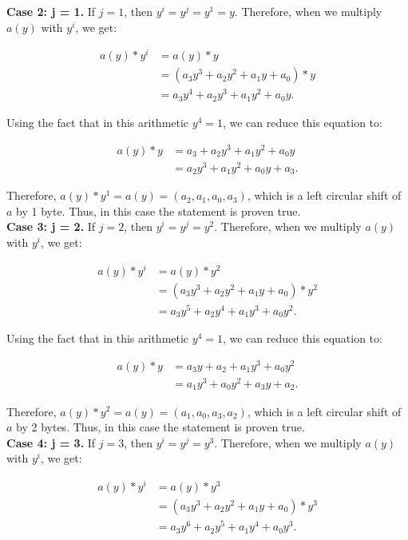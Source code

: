 \documentclass[11pt]{article}
\theoremstyle{definition}
\begin{document}
\begin{enumerate}
\begin{enumerate}
\begin{enumerate}
\textbf{Case 2: j = 1.}
If $j = 1$, then $y^i = y^j = y^1 = y$. Therefore, when we multiply $a(y)$ with $y^i$, we get:

\begin{align*}
    a(y) * y^i &= a(y) * y \\
    &= (a_3y^3 + a_2y^2 + a_1y + a_0) * y \\
    &= a_3y^4 + a_2y^3 + a_1y^2 + a_0y.
\end{align*}

Using the fact that in this arithmetic $y^4 = 1$, we can reduce this equation to:

\begin{align*}
    a(y) * y &= a_3 + a_2y^3 + a_1y^2 + a_0y\\
    &= a_2y^3 + a_1y^2 + a_0y + a_3.
\end{align*}

Therefore, $a(y) * y^1 = a(y) = (a_2, a_1, a_0, a_3)$, which is a left  circular shift of $a$ by 1 byte. Thus, in this case the statement is proven true.
\\

\textbf{Case 3: j = 2.}
If $j = 2$, then $y^i = y^j = y^2$. Therefore, when we multiply $a(y)$ with $y^i$, we get:

\begin{align*}
    a(y) * y^i &= a(y) * y^2 \\
    &= (a_3y^3 + a_2y^2 + a_1y + a_0) * y^2 \\
    &= a_3y^5 + a_2y^4 + a_1y^3 + a_0y^2.
\end{align*}

Using the fact that in this arithmetic $y^4 = 1$, we can reduce this equation to:

\begin{align*}
    a(y) * y &= a_3y + a_2 + a_1y^3 + a_0y^2 \\
    &= a_1y^3 + a_0y^2 + a_3y + a_2.
\end{align*}

Therefore, $a(y) * y^2 = a(y) = (a_1, a_0, a_3, a_2)$, which is a left  circular shift of $a$ by 2 bytes. Thus, in this case the statement is proven true.
\\

\textbf{Case 4: j = 3.}
If $j = 3$, then $y^i = y^j = y^3$. Therefore, when we multiply $a(y)$ with $y^i$, we get:

\begin{align*}
    a(y) * y^i &= a(y) * y^3 \\
    &= (a_3y^3 + a_2y^2 + a_1y + a_0) * y^3 \\
    &= a_3y^6 + a_2y^5 + a_1y^4 + a_0y^3.
\end{align*}


\end{enumerate}
\end{enumerate}
\end{enumerate}
\end{document}
